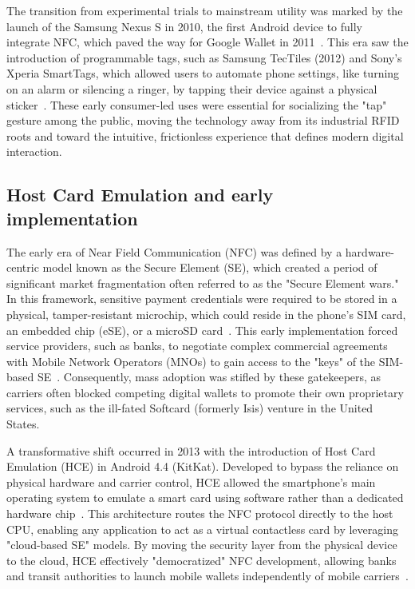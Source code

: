\documentclass[sigconf, nonacm]{acmart}
\begin{document}
The transition from experimental trials to mainstream utility was marked by the launch of the Samsung Nexus S in 2010, the first Android device to fully integrate NFC, which paved the way for Google Wallet in 2011~\cite{tragging2023history}. This era saw the introduction of programmable tags, such as Samsung TecTiles (2012) and Sony’s Xperia SmartTags, which allowed users to automate phone settings, like turning on an alarm or silencing a ringer, by tapping their device against a physical sticker~\cite{lathiya2021near}. These early consumer-led uses were essential for socializing the "tap" gesture among the public, moving the technology away from its industrial RFID roots and toward the intuitive, frictionless experience that defines modern digital interaction.


\subsection{Host Card Emulation and early implementation}

The early era of Near Field Communication (NFC) was defined by a hardware-centric model known as the Secure Element (SE), which created a period of significant market fragmentation often referred to as the "Secure Element wars." In this framework, sensitive payment credentials were required to be stored in a physical, tamper-resistant microchip, which could reside in the phone's SIM card, an embedded chip (eSE), or a microSD card~\cite{lepojevic2014implementing}. This early implementation forced service providers, such as banks, to negotiate complex commercial agreements with Mobile Network Operators (MNOs) to gain access to the "keys" of the SIM-based SE~\cite{thales2023host}. Consequently, mass adoption was stifled by these gatekeepers, as carriers often blocked competing digital wallets to promote their own proprietary services, such as the ill-fated Softcard (formerly Isis) venture in the United States.

A transformative shift occurred in 2013 with the introduction of Host Card Emulation (HCE) in Android 4.4 (KitKat). Developed to bypass the reliance on physical hardware and carrier control, HCE allowed the smartphone's main operating system to emulate a smart card using software rather than a dedicated hardware chip~\cite{nikam2017near}. This architecture routes the NFC protocol directly to the host CPU, enabling any application to act as a virtual contactless card by leveraging "cloud-based SE" models. By moving the security layer from the physical device to the cloud, HCE effectively "democratized" NFC development, allowing banks and transit authorities to launch mobile wallets independently of mobile carriers~\cite{prakash2015host}.
\end{document}
